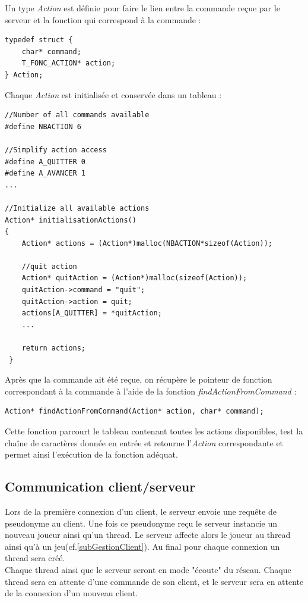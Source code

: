 \documentclass[a4paper,10pt]{article}
\begin{document}
	Un type \emph{Action} est définie pour faire le lien entre la commande reçue par le serveur et la fonction qui correspond à la commande :
\begin{lstlisting}
typedef struct {
    char* command;
    T_FONC_ACTION* action;
} Action;
\end{lstlisting}

	Chaque \emph{Action} est initialisée et conservée dans un tableau :

\begin{lstlisting}
//Number of all commands available
#define NBACTION 6

//Simplify action access
#define A_QUITTER 0
#define A_AVANCER 1
...

//Initialize all available actions
Action* initialisationActions()
{
    Action* actions = (Action*)malloc(NBACTION*sizeof(Action));

    //quit action
    Action* quitAction = (Action*)malloc(sizeof(Action));
    quitAction->command = "quit";
    quitAction->action = quit;
    actions[A_QUITTER] = *quitAction;
    ...
    
	return actions;
 }
\end{lstlisting}

	Après que la commande ait été reçue, on récupère le pointeur de fonction correspondant à la commande à l'aide de la fonction \emph{findActionFromCommand} :
\begin{lstlisting}
Action* findActionFromCommand(Action* action, char* command);
\end{lstlisting}

	Cette fonction parcourt le tableau contenant toutes les actions disponibles, test la chaîne de caractères donnée en entrée et retourne l'\emph{Action}
correspondante et permet ainsi l'exécution de la fonction adéquat.

	\subsection{Communication client/serveur}
	Lors de la première connexion d'un client, le serveur envoie une requête de pseudonyme au client. Une fois ce pseudonyme reçu le serveur instancie un
nouveau joueur ainsi qu'un thread. Le serveur affecte alors le joueur au thread ainsi qu'à un jeu(cf.\ref{subGestionClient}). Au final pour chaque connexion un
thread sera créé.\\
	Chaque thread ainsi que le serveur seront en mode "écoute" du réseau. Chaque thread sera en attente d'une commande de son client, et le serveur sera en
attente de la connexion d'un nouveau client.\\
\end{document}
